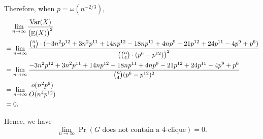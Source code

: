 \documentclass{homework}
\begin{document}
\begin{solution}
  Therefore, when $p = \omega(n^{-2/3})$,
  \begin{align*}
    & \quad \lim_{n \to \infty} \frac{\mathop{\mathrm{Var}}\displaylimits(X)}{{\bigl(\mathop{\mathbb{E}}\displaylimits(X)\bigr)}^{2}} \\
    & = \lim_{n \to \infty}\frac{\binom{n}{4} \cdot (-3 n^2 p^{12} + 3 n^2 p^{11} + 14 n p^{12} - 18 n p^{11} + 4 n p^9 - 21 p^{12} + 24 p^{11} - 4 p^9 + p^6)}
    {\bigl(\binom{n}{4} \cdot (p^6 - p^{12})\bigr)^2} \\
    & = \lim_{n \to \infty}\frac{-3 n^2 p^{12} + 3 n^2 p^{11} + 14 n p^{12} - 18 n p^{11} + 4 n p^9 - 21 p^{12} + 24 p^{11} - 4 p^9 + p^6}
    {\binom{n}{4}(p^6 - p^{12})^2} \\
    & = \lim_{n \to \infty}\frac{o(n^2p^6)}{O(n^4p^{12})} \\
    & = 0.
  \end{align*}

  Hence, we have
  \begin{equation*}
    \lim_{n \to \infty} \Pr(G \text{ does not contain a $4$-clique}) = 0.
  \end{equation*}

\end{solution}
\end{document}
